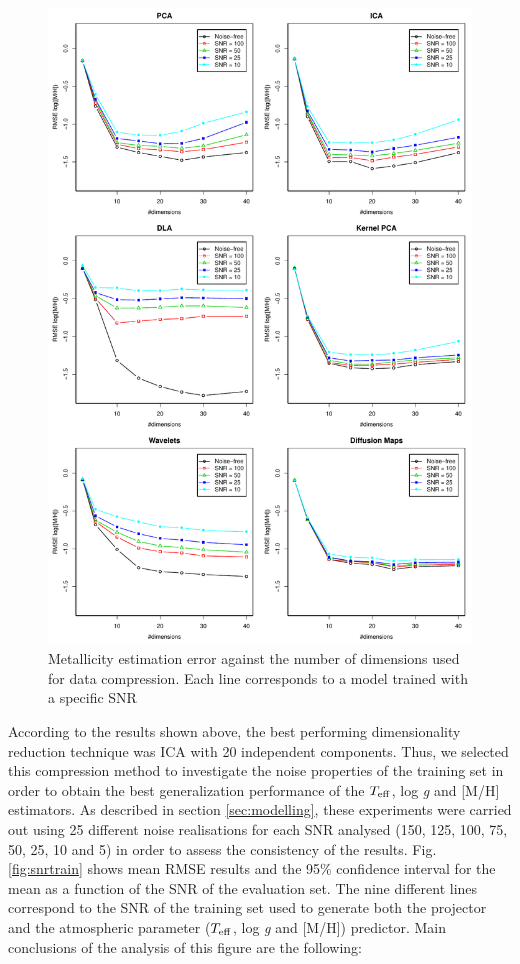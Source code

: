 \documentclass[a4paper,fleqn,usenatbib]{mnras}
\begin{document}
{{{\begin{figure}
\centering\includegraphics[height=0.95\textheight]{flamesHR10_Meta_log_BestSVM_N-SNR-RMSE_test.pdf}
\caption{Metallicity estimation error against the number of dimensions
  used for data compression. Each line corresponds to a model trained
  with a specific SNR}
\label{fig:methodsnrMeta}
\end{figure}

According to the results shown above, the best performing
dimensionality reduction technique was ICA with 20 independent
components. Thus, we selected
this compression method to investigate the noise properties of
  the training set in order to obtain the best generalization
performance of the $T_{\rm eff}$, log \textit{g} and [M/H]
estimators.  As described in section \ref{sec:modelling}, these
experiments were carried out using 25 different noise
  realisations for each SNR analysed (150, 125, 100, 75, 50, 25, 10
and 5) in order to assess the consistency of the results.  Fig.~
\ref{fig:snrtrain} shows mean RMSE results and the 95\% confidence
interval for the mean as a function of the SNR of the evaluation
set. The nine different lines correspond to the SNR of the
training set used to generate both the projector and the atmospheric 
parameter ($T_{\rm eff}$, log \textit{g} and [M/H]) predictor. 
Main conclusions of the analysis of this figure are the
following:

}}}
\end{document}
